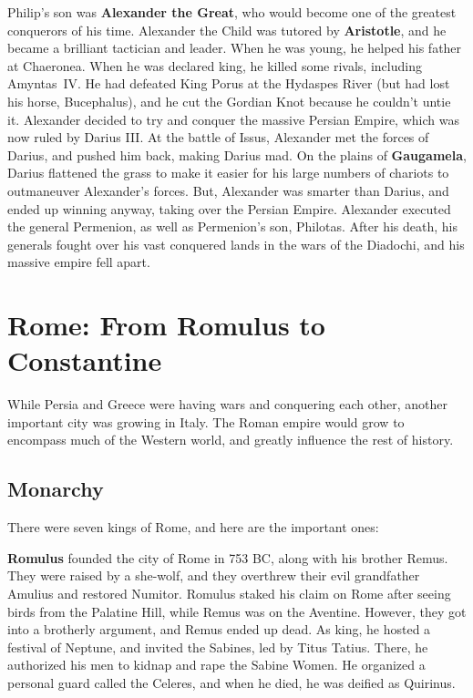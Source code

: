 Philip's son was \textbf{Alexander the Great}, who would become one of the greatest conquerors of his time.
Alexander the Child was tutored by \textbf{Aristotle}, and he became a brilliant tactician and leader.
When he was young, he helped his father at Chaeronea.
When he was declared king, he killed some rivals, including Amyntas~IV\@.
He had defeated King Porus at the Hydaspes River (but had lost his horse, Bucephalus),
and he cut the Gordian Knot because he couldn't untie it.
Alexander decided to try and conquer the massive Persian Empire, which was now ruled by Darius III\@.
At the battle of Issus, Alexander met the forces of Darius, and pushed him back, making Darius mad.
On the plains of \textbf{Gaugamela}, Darius flattened the grass to make it easier for his
large numbers of chariots to outmaneuver Alexander's forces.
But, Alexander was smarter than Darius, and ended up winning anyway, taking over the Persian Empire.
Alexander executed the general Permenion, as well as Permenion's son, Philotas.
After his death, his generals fought over his vast conquered lands in the wars of the Diadochi,
and his massive empire fell apart.

\section{Rome: From Romulus to Constantine}

While Persia and Greece were having wars and conquering each other, another important city was growing in Italy.
The Roman empire would grow to encompass much of the Western world,
and greatly influence the rest of history.

\subsection*{Monarchy}

There were seven kings of Rome, and here are the important ones:

\textbf{Romulus} founded the city of Rome in 753 BC, along with his brother Remus.
They were raised by a she-wolf, and they overthrew their evil grandfather Amulius and restored Numitor.
Romulus staked his claim on Rome after seeing birds from the Palatine Hill, while Remus was on the Aventine.
However, they got into a brotherly argument, and Remus ended up dead.
As king, he hosted a festival of Neptune, and invited the Sabines, led by Titus Tatius.
There, he authorized his men to kidnap and rape the Sabine Women.
He organized a personal guard called the Celeres,
and when he died, he was deified as Quirinus.

